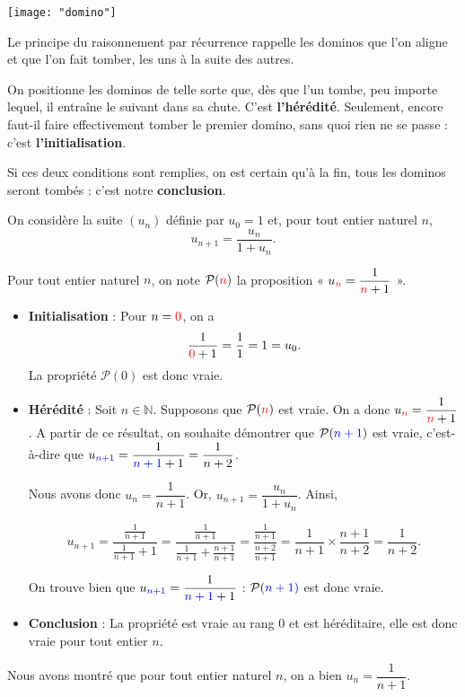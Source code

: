 \documentclass[11pt,fleqn]{book} %
\begin{document}
\begin{minipage}{0.15\linewidth}
\begin{center}
\texttt{[image: "domino"]}
\end{center}
\end{minipage}\hfill\begin{minipage}{0.78\linewidth}
Le principe du raisonnement par récurrence rappelle les dominos que l'on aligne et que l'on fait tomber, les uns à la suite des autres.

\vskip5pt
On positionne les dominos de telle sorte que, dès que l'un tombe, peu importe lequel, il entraîne le suivant dans sa chute. C'est \textbf{l'hérédité}. Seulement, encore faut-il faire effectivement tomber le premier domino, sans quoi rien ne se passe : c'est \textbf{l'initialisation}.

\vskip5pt
Si ces deux conditions sont remplies, on est certain qu'à la fin, tous les dominos seront tombés : c'est notre \textbf{conclusion}.\end{minipage}

\newpage
\begin{example}
On considère la suite \((u_n)\) définie par \(u_0=1\) et, pour tout entier naturel \(n\), \[u_{n+1}=\dfrac{u_n}{1+u_n}.\]

Pour tout entier naturel $n$, on note \(\mathcal{P}(\color{red}n\color{black})\) la proposition  « \(u_{\color{red}n}=\dfrac{1}{\color{red}n\color{black}+1}\) ».
\begin{itemize}
\item \textbf{Initialisation} : Pour \(n=\color{red}0\), on a \[\dfrac{1}{\color{red}0\color{black}+1}=\dfrac{1}{1}=1=u_0.\] La propriété $\mathcal{P}(0)$ est donc vraie.
\item \textbf{Hérédité} : Soit \(n\in\mathbb{N}\). Supposons que \(\mathcal{P}(\color{red}n\color{black})\) est vraie. On a donc \(u_{\color{red}n} = \dfrac{1}{\color{red}n\color{black}+1}\). A partir de ce résultat, on souhaite démontrer que \(\mathcal{P}(\color{blue}{n+1}\color{black})\) est vraie, c'est-à-dire que \(u_{\color{blue}{n+1}}=\dfrac{1}{\color{blue}{n+1}\color{black}+1}=\dfrac{1}{n+2}\).

Nous avons donc \( u_n = \dfrac{1}{n+1}\). Or, \(u_{n+1} = \dfrac{u_n}{1+u_n}\). Ainsi,

\[ u_{n+1} = \dfrac{\frac{1}{n+1}}{\frac{1}{n+1}+1}=\dfrac{\frac{1}{n+1}}{\frac{1}{n+1}+\frac{n+1}{n+1}}=\dfrac{\frac{1}{n+1}}{\frac{n+2}{n+1}}=\dfrac{1}{n+1} \times \dfrac{n+1}{n+2}=\dfrac{1}{n+2}. \]

On trouve bien que \(u_{\color{blue}{n+1}}=\dfrac{1}{\color{blue}{n+1}\color{black}+1}\) : \( \mathcal{P}( \color{blue}{n+1})\) est donc vraie.
\item \textbf{Conclusion} : La propriété est vraie au rang 0 et est héréditaire, elle est donc vraie pour tout entier \(n\).\end{itemize}
Nous avons montré que pour tout entier naturel \(n\), on a bien \(u_n= \dfrac{1}{n+1}\).\end{example}
\end{document}
